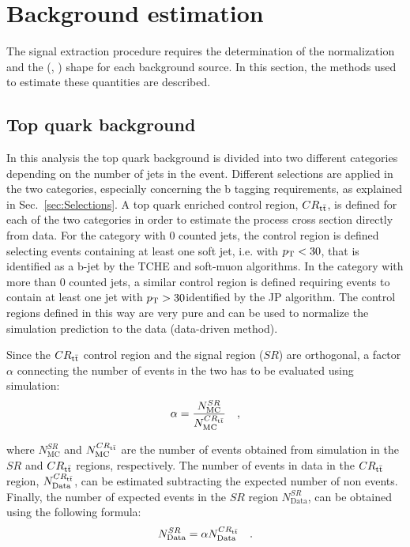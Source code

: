 \section{Background estimation}
\label{sec:Backgrounds}
The signal extraction procedure requires the determination of the normalization and the (\mll, \mt)
shape for each background source. In this section, the methods used to estimate these quantities are described.

\subsection{Top quark background \label{sec:TTBackground}}

In this analysis the top quark background is divided into two different categories depending on the number of jets in the event. Different selections are applied in the two categories, especially concerning the b tagging requirements, as explained in Sec.~\ref{sec:Selections}.
A top quark enriched control region, $CR_{\mathrm{t}\bar{\mathrm{t}}}$, is defined for each of the two categories in order to estimate the process cross section directly from data. For the category with 0 counted jets, the control region is defined selecting events containing at least one soft jet, i.e. with $p_\mathrm{T} < 30$\GeV, that is identified as a b-jet by the TCHE and soft-muon algorithms. In the category with more than 0 counted jets, a similar control region is defined requiring events to contain at least one jet with $p_\mathrm{T}>30$\GeV identified by the JP algorithm. The control regions defined in this way are very pure and can be used to normalize the simulation prediction to the data (data-driven method).

Since the $CR_{\mathrm{t}\bar{\mathrm{t}}}$ control region and the signal region ($SR$) are orthogonal, a factor $\alpha$ connecting the number of events in the two has to be evaluated using simulation:
\begin{equation}
\alpha = \frac{N_\mathrm{MC}^{SR}}{N_\mathrm{MC}^{CR_{\mathrm{t}\bar{\mathrm{t}}}}} \quad ,
\end{equation}

\noindent where $N_\mathrm{MC}^{SR}$ and $N_\mathrm{MC}^{CR_{\mathrm{t}\bar{\mathrm{t}}}}$ are the number of \ttbar events obtained from simulation in the $SR$ and $CR_{\mathrm{t}\bar{\mathrm{t}}}$ regions, respectively. The number of \ttbar events in data in the $CR_{\mathrm{t}\bar{\mathrm{t}}}$ region, $N_\mathrm{Data}^{CR_{\mathrm{t}\bar{\mathrm{t}}}}$, can be estimated subtracting the expected number of non \ttbar events. Finally, the number of expected events in the $SR$ region $N_\mathrm{Data}^{SR}$, can be obtained using the following formula:
\begin{equation}
N_\mathrm{Data}^{SR} = \alpha N_\mathrm{Data}^{CR_{\mathrm{t}\bar{\mathrm{t}}}} \quad .
\end{equation}

